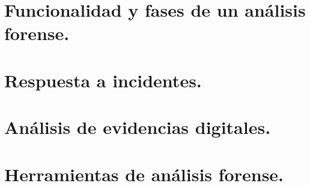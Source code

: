 \documentclass[letterpaper,10pt,spanish]{sphinxmanual}
\begin{document}
\section{Funcionalidad y fases de un análisis forense.}
\label{\detokenize{tema_pautas_seguridad_informatica/tema_pautas_seguridad_informatica:funcionalidad-y-fases-de-un-analisis-forense}}

\section{Respuesta a incidentes.}
\label{\detokenize{tema_pautas_seguridad_informatica/tema_pautas_seguridad_informatica:respuesta-a-incidentes}}

\section{Análisis de evidencias digitales.}
\label{\detokenize{tema_pautas_seguridad_informatica/tema_pautas_seguridad_informatica:analisis-de-evidencias-digitales}}

\section{Herramientas de análisis forense.}
\label{\detokenize{tema_pautas_seguridad_informatica/tema_pautas_seguridad_informatica:herramientas-de-analisis-forense}}
\end{document}
